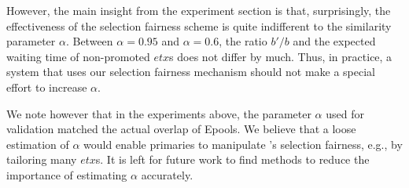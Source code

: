 However, the main insight from the experiment section is that, surprisingly, the effectiveness of the selection fairness scheme is quite indifferent to the similarity parameter $\alpha$. Between $\alpha=0.95$ and $\alpha=0.6$, the ratio $b'/b$ and the expected waiting time of non-promoted $etx$s does not differ by much. Thus, in practice, a system that uses our selection fairness mechanism should not make a special effort to increase $\alpha$. 

We note however that in the experiments above, the parameter $\alpha$ used for validation matched the actual overlap of Epools. We believe that a loose estimation of $\alpha$ would enable primaries to manipulate \nameNS's selection fairness, e.g., by tailoring many $etx$s. It is left for future work to find methods to reduce the importance of estimating $\alpha$ accurately.   


